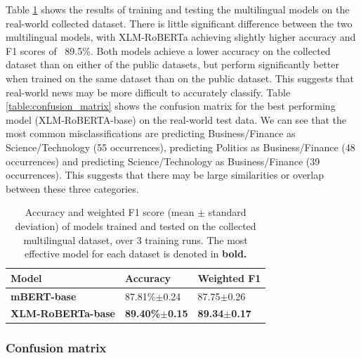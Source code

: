 \documentclass{l4proj}
\begin{document}
Table \ref{table:realworld-effectiveness} shows the results of training and testing the multilingual models on the real-world collected dataset. There is little significant difference between the two multilingual models, with XLM-RoBERTa achieving slightly higher accuracy and F1 scores of ~89.5\%. Both models achieve a lower accuracy on the collected dataset than on either of the public datasets, but perform significantly better when trained on the same dataset than on the public dataset. This suggests that real-world news may be more difficult to accurately classify.
Table \ref{table:confusion_matrix} shows the confusion matrix for the best performing model (XLM-RoBERTA-base) on the real-world test data. We can see that the most common misclassifications are predicting Business/Finance as Science/Technology (55 occurrences), predicting Politics as Business/Finance (48 occurrences) and predicting Science/Technology as Business/Finance (39 occurrences). This suggests that there may be large similarities or overlap between these three categories.

\begin{table}[]
\begin{tabular}{lll}
\hline
\textbf{Model}   & \textbf{Accuracy} & \textbf{Weighted F1} \\ \hline
\textbf{mBERT-base}       & 87.81\%$\pm$0.24     & 87.75$\pm$0.26        \\
\textbf{XLM-RoBERTa-base} & \textbf{89.40\%$\pm$0.15}     & \textbf{89.34$\pm$0.17}                 \\ \hline
\end{tabular}
\caption{Accuracy and weighted F1 score (mean $\pm$ standard deviation) of models trained and tested on the collected multilingual dataset, over 3 training runs. The most effective model for each dataset is denoted in \textbf{bold.}}
\label{table:realworld-effectiveness}
\end{table}

\subsubsection{Confusion matrix}
\end{document}

